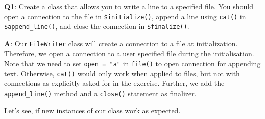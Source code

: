 \documentclass[
]{krantz}
\makeatletter
\newenvironment{Shaded}{\begin{snugshade}}{\end{snugshade}}
\newcommand{\CharTok}[1]{\textcolor[rgb]{0.31,0.60,0.02}{#1}}
\newcommand{\CommentTok}[1]{\textcolor[rgb]{0.56,0.35,0.01}{\textit{#1}}}
\newcommand{\ControlFlowTok}[1]{\textcolor[rgb]{0.13,0.29,0.53}{\textbf{#1}}}
\newcommand{\DataTypeTok}[1]{\textcolor[rgb]{0.13,0.29,0.53}{#1}}
\newcommand{\KeywordTok}[1]{\textcolor[rgb]{0.13,0.29,0.53}{\textbf{#1}}}
\newcommand{\NormalTok}[1]{#1}
\newcommand{\OperatorTok}[1]{\textcolor[rgb]{0.81,0.36,0.00}{\textbf{#1}}}
\newcommand{\OtherTok}[1]{\textcolor[rgb]{0.56,0.35,0.01}{#1}}
\newcommand{\StringTok}[1]{\textcolor[rgb]{0.31,0.60,0.02}{#1}}
\newenvironment{kframe}{%
\medskip{}
\setlength{\fboxsep}{.8em}
 \def\at@end@of@kframe{}%
 \ifinner\ifhmode%
  \def\at@end@of@kframe{\end{minipage}}%
  \begin{minipage}{\columnwidth}%
 \fi\fi%
 \def\FrameCommand##1{\hskip\@totalleftmargin \hskip-\fboxsep
 \colorbox{shadecolor}{##1}\hskip-\fboxsep
     \hskip-\linewidth \hskip-\@totalleftmargin \hskip\columnwidth}%
 \MakeFramed {\advance\hsize-\width
   \@totalleftmargin\z@ \linewidth\hsize
   \@setminipage}}%
 {\par\unskip\endMakeFramed%
 \at@end@of@kframe}
\renewenvironment{Shaded}{\begin{kframe}}{\end{kframe}}
\renewcommand{\KeywordTok} [1]{\textcolor[rgb]{0.00,0.44,0.13}{{#1}}}
\renewcommand{\DataTypeTok}[1]{\textcolor[rgb]{0.56,0.13,0.00}{{#1}}}
\renewcommand{\CharTok}    [1]{\textcolor[rgb]{0.25,0.44,0.63}{{#1}}}
\renewcommand{\StringTok}  [1]{\textcolor[rgb]{0.25,0.44,0.63}{{#1}}}
\renewcommand{\CommentTok} [1]{\textcolor[rgb]{0.38,0.63,0.69}{{#1}}}
\renewcommand{\OtherTok}   [1]{\textcolor[rgb]{0.00,0.44,0.13}{{#1}}}
\renewcommand{\NormalTok}  [1]{{#1}}
\makeatother
\begin{document}
\textbf{{Q1}}: Create a class that allows you to write a line to a specified file. You should open a connection to the file in \texttt{\$initialize()}, append a line using \texttt{cat()} in \texttt{\$append\_line()}, and close the connection in \texttt{\$finalize()}.

\textbf{{A}}: Our \texttt{FileWriter} class will create a connection to a file at initialization. Therefore, we open a connection to a user specified file during the initialisation. Note that we need to set \texttt{open\ =\ "a"} in \texttt{file()} to open connection for appending text. Otherwise, \texttt{cat()} would only work when applied to files, but not with connections as explicitly asked for in the exercise. Further, we add the \texttt{append\_line()} method and a \texttt{close()} statement as finalizer.

\begin{Shaded}
\end{Shaded}

Let's see, if new instances of our class work as expected.

\begin{Shaded}
\end{Shaded}
\end{document}
